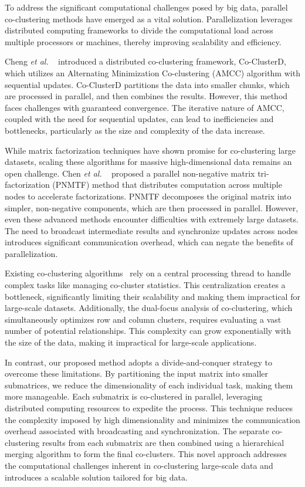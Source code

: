 \documentclass[journal]{IEEEtran}
\renewcommand{\cite}[1]{~\autocite{#1}}
\begin{document}
To address the significant computational challenges posed by big data, parallel co-clustering methods have emerged as a vital solution. Parallelization leverages distributed computing frameworks to divide the computational load across multiple processors or machines, thereby improving scalability and efficiency.

Cheng \textit{et al.} \cite{cheng2015CoClusterDDistributedFramework} introduced a distributed co-clustering framework, Co-ClusterD, which utilizes an Alternating Minimization Co-clustering (AMCC) algorithm with sequential updates. Co-ClusterD partitions the data into smaller chunks, which are processed in parallel, and then combines the results. However, this method faces challenges with guaranteed convergence. The iterative nature of AMCC, coupled with the need for sequential updates, can lead to inefficiencies and bottlenecks, particularly as the size and complexity of the data increase.

While matrix factorization techniques have shown promise for co-clustering large datasets, scaling these algorithms for massive high-dimensional data remains an open challenge. Chen \textit{et al.} \cite{chen2023ParallelNonNegativeMatrix} proposed a parallel non-negative matrix tri-factorization (PNMTF) method that distributes computation across multiple nodes to accelerate factorizations. PNMTF decomposes the original matrix into simpler, non-negative components, which are then processed in parallel. However, even these advanced methods encounter difficulties with extremely large datasets. The need to broadcast intermediate results and synchronize updates across nodes introduces significant communication overhead, which can negate the benefits of parallelization.

Existing co-clustering algorithms\cite{chen2023ParallelNonNegativeMatrix, cheng2015CoClusterDDistributedFramework} rely on a central processing thread to handle complex tasks like managing co-cluster statistics. This centralization creates a bottleneck, significantly limiting their scalability and making them impractical for large-scale datasets. Additionally, the dual-focus analysis of co-clustering, which simultaneously optimizes row and column clusters, requires evaluating a vast number of potential relationships. This complexity can grow exponentially with the size of the data, making it impractical for large-scale applications.

In contrast, our proposed method adopts a divide-and-conquer strategy to overcome these limitations. By partitioning the input matrix into smaller submatrices, we reduce the dimensionality of each individual task, making them more manageable. Each submatrix is co-clustered in parallel, leveraging distributed computing resources to expedite the process. This technique reduces the complexity imposed by high dimensionality and minimizes the communication overhead associated with broadcasting and synchronization. The separate co-clustering results from each submatrix are then combined using a hierarchical merging algorithm to form the final co-clusters. This novel approach addresses the computational challenges inherent in co-clustering large-scale data and introduces a scalable solution tailored for big data.
\end{document}
